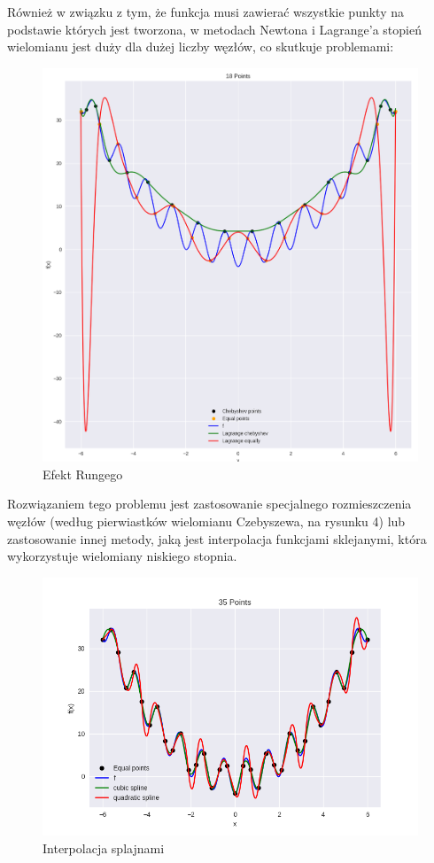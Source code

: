 \documentclass{article}
\begin{document}
Również w związku z tym, że funkcja musi zawierać wszystkie punkty na podstawie których jest tworzona, w metodach Newtona i 
Lagrange'a stopień wielomianu jest duży dla dużej liczby węzłów, co skutkuje problemami: 

\begin{figure}[H]
    \centering
    \includegraphics[width=\textwidth]{img/lagr_18.png}
    \caption{Efekt Rungego}
\end{figure}

Rozwiązaniem tego problemu jest zastosowanie specjalnego rozmieszczenia węzłów (według pierwiastków wielomianu Czebyszewa, na rysunku 4)
lub zastosowanie innej metody, jaką jest interpolacja funkcjami sklejanymi, która wykorzystuje wielomiany niskiego stopnia.

\begin{figure}[H]
    \centering
    \includegraphics[width=\textwidth]{img/spline_35.png}
    \caption{Interpolacja splajnami}
\end{figure}
\end{document}
